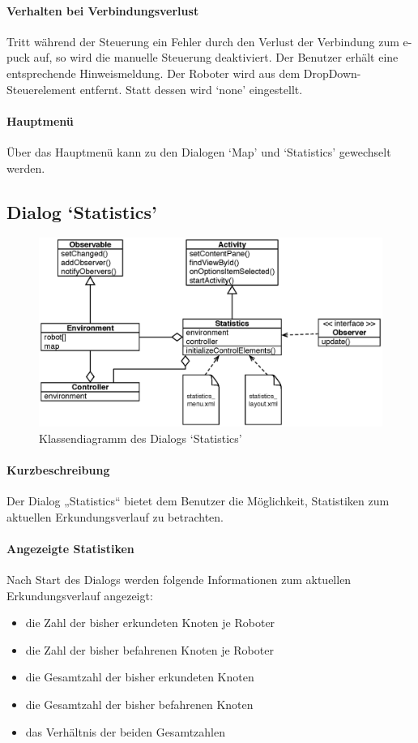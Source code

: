 \documentclass[10pt,a4paper]{article}
\begin{document}
	\paragraph*{Verhalten bei Verbindungsverlust} Tritt während der Steuerung ein Fehler durch den Verlust der Verbindung zum e-puck auf, so wird die
	manuelle Steuerung deaktiviert. Der Benutzer erhält eine entsprechende Hinweismeldung. Der Roboter wird aus dem DropDown-Steuerelement entfernt.
	Statt dessen wird `none' eingestellt.
	
	\paragraph*{Hauptmenü} Über das Hauptmenü kann zu den Dialogen `Map' und `Statistics' gewechselt werden.
	
	\subsection*{Dialog `Statistics'}
	
	\begin{figure}[h]
			\centering
			\includegraphics[width=14cm]{images/entwurf_statistics.eps}
  			\caption{Klassendiagramm des Dialogs `Statistics'}
  	\end{figure}
	
	\paragraph*{Kurzbeschreibung} Der Dialog „Statistics“ bietet dem Benutzer die Möglichkeit, Statistiken zum aktuellen Erkundungsverlauf zu
	betrachten.
	
	\paragraph*{Angezeigte Statistiken} Nach Start des Dialogs werden folgende Informationen zum aktuellen Erkundungsverlauf angezeigt:
	\begin{itemize}
	\item die Zahl der bisher erkundeten Knoten je Roboter
	\item die Zahl der bisher befahrenen Knoten je Roboter
	\item die Gesamtzahl der bisher erkundeten Knoten
	\item die Gesamtzahl der bisher befahrenen Knoten
	\item das Verhältnis der beiden Gesamtzahlen
	\end{itemize}
	
\end{document}

